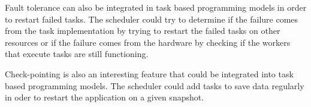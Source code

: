 Fault tolerance can also be integrated in task based programming models in order to restart failed tasks.
The scheduler could try to determine if the failure comes from the task implementation by trying to restart the failed tasks on other resources or if the failure comes from the hardware by checking if the workers that execute tasks are still functioning.

Check-pointing is also an interesting feature that could be integrated into task based programming models.
The scheduler could add tasks to save data regularly in oder to restart the application on a given snapshot.